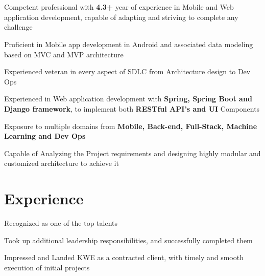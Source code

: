 \documentclass[]{deedy-resume-openfont}
\begin{document}
    
%
%
%
%
\section{}
\raggedright

\begin{tightemize}
	\item Competent professional with \textbf{4.3+} year of experience in Mobile and Web application development, capable of adapting and striving to complete any challenge
	\item Proficient in Mobile app development in Android and associated data modeling based on MVC and MVP architecture
	\item Experienced veteran in every aspect of SDLC from Architecture design to Dev Ops
	\item Experienced in Web application development with \textbf{Spring, Spring Boot and Django framework}, to implement both \textbf{RESTful API's and UI} Components
	\item Exposure to multiple domains from \textbf{Mobile, Back-end, Full-Stack, Machine Learning and Dev Ops}
	\item Capable of Analyzing the Project requirements and designing highly modular and customized architecture to achieve it
\end{tightemize}
\sectionsep
%
%
\section{Experience}
\hfill {}
\begin{tightemize}
	\item Recognized as one of the top talents
	\item Took up additional leadership responsibilities, and successfully completed them
	\item Impressed and Landed KWE as a contracted client, with timely and smooth execution of initial projects
\end{tightemize}
\sectionsep
%
%
\end{document}
